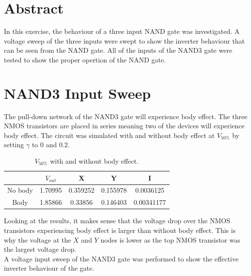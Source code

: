 \documentclass[CMPE]{../KGCOEReport}
\begin{document}
    \maketitle
    \section*{Abstract}

    In this exercise, the behaviour of a three input NAND
    gate was investigated. A voltage sweep of the three inputs
    were swept to show the inverter behaviour that can be seen
    from the NAND gate. All of the inputs of the NAND3 gate
    were tested to show the proper opertion of the NAND gate. \\

    \section*{NAND3 Input Sweep}
    
    The pull-down network of the NAND3 gate will experience body effect.
    The three NMOS transistors are placed in series meaning two of the
    devices will experience body effect. The circuit was simulated with and
    without body effect at $V_{50\%}$ by setting $\gamma$ to $0$ and $0.2$.

	\begin{table}[h!]
		\renewcommand{\arraystretch}{1.3}
		\setlength{\tabcolsep}{12pt}
		\caption{$V_{50\%}$ with and without body effect.}
		\begin{center}
		    \begin{tabular}{|c|c|c|c|c|}\hline
		    & $V_{out}$ & X & Y & I\\\hline
		    No body & 1.70995 & 0.359252 & 0.155978 & 0.0036125 \\\hline
		    Body    & 1.85866 & 0.33856 & 0.146403 & 0.00341177 \\\hline
		    \end{tabular}
		\end{center}
		\label{tab:cmos}
	\end{table}

	Looking at the results, it makes sense that the voltage drop
	over the NMOS transistors experiencing body effect is larger
	than without body effect. This is why the voltage at the $X$ and
	$Y$ nodes is lower as the top NMOS transistor was the largest
	voltage drop.\\

     A voltage input sweep of the NAND3 gate was performed
     to show the effective inverter behaviour of the gate.
     
\end{document}
